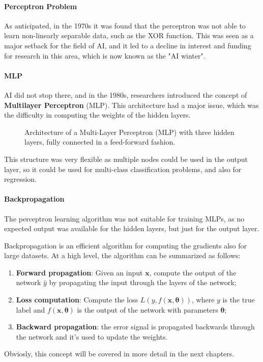 \paragraph{Perceptron Problem}
As anticipated, in the 1970s it was found that the perceptron was not able to learn non-linearly separable data, such as the XOR function.
This was seen as a major setback for the field of AI, and it led to a decline in interest and funding for research in this area, which is now known as the "AI winter".

\paragraph{MLP}
AI did not stop there, and in the 1980s, researchers introduced the concept of \textbf{Multilayer Perceptron} (MLP). This architecture
had a major issue, which was the difficulty in computing the weights of the hidden layers.
\begin{figure}[H]
    \centering
    \scalebox{0.8}{
        
    }
    \caption{Architecture of a Multi-Layer Perceptron (MLP) with three hidden layers, fully connected in a feed-forward fashion.}
    \label{fig:mlp}
\end{figure}
This structure was very flexible as multiple nodes could be used in the output layer, so it could be used for multi-class classification problems, and also for regression.

\paragraph{Backpropagation}
\label{introduction-backpropagation}
The perceptron learning algorithm was not suitable for training MLPs, as no expected output was available for the hidden layers, but just for the output layer.

Backpropagation is an efficient algorithm for computing the gradients also for large datasets.
At a high level, the algorithm can be summarized as follows:
\begin{enumerate}
    \item \textbf{Forward propagation}: Given an input $\boldsymbol{x}$, compute the output of the network $\hat{y}$ by 
    propagating the input through the layers of the network;
    \item \textbf{Loss computation}: Compute the loss $L(y, f(\boldsymbol{x}, \boldsymbol{\theta}))$, where $y$ is the true label and $f(\boldsymbol{x}, \boldsymbol{\theta})$ is the output of the network with parameters $\boldsymbol{\theta}$;
    \item \textbf{Backward propagation}: the error signal is propagated backwards through the network and it's used to update the weights.
\end{enumerate}
Obviosly, this concept will be covered in more detail in the next chapters.

